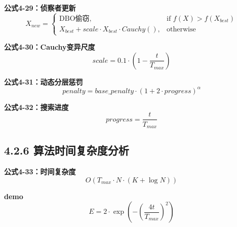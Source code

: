 \documentclass[12pt]{article}
\begin{document}
\textbf{公式4-29：侦察者更新}
\begin{equation}
X_{new} = \begin{cases}
\text{DBO偷窃}, & \text{if } f(X) > f(X_{best}) \\
X_{best} + scale \cdot X_{best} \cdot Cauchy(), & \text{otherwise}
\end{cases}
\end{equation}

\textbf{公式4-30：Cauchy变异尺度}
\begin{equation}
scale = 0.1 \cdot \left(1 - \frac{t}{T_{max}}\right)
\end{equation}

\textbf{公式4-31：动态分层惩罚}
\begin{equation}
penalty = base\_penalty \cdot (1 + 2 \cdot progress)^{\alpha}
\end{equation}

\textbf{公式4-32：搜索进度}
\begin{equation}
progress = \frac{t}{T_{max}}
\end{equation}

\subsection{4.2.6 算法时间复杂度分析}

\textbf{公式4-33：时间复杂度}
\begin{equation}
O(T_{max} \cdot N \cdot (K + \log N))
\end{equation}

\textbf{demo}
\begin{equation}
E = 2 \cdot \exp\left(-\left(\frac{4t}{T_{max}}\right)^2\right)
\end{equation}
\end{document}
